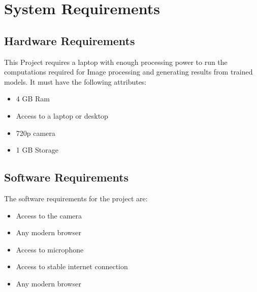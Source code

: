 \section{System Requirements}
\subsection{Hardware Requirements}
This Project requires a laptop with enough processing power to run the computations required for Image processing and generating results from trained models. It must have the following attributes:
\begin{itemize}
    \item 4 GB Ram
    \item Access to a laptop or desktop
    \item 720p camera
    \item 1 GB Storage
\end{itemize}
\subsection{Software Requirements}
The software requirements for the project are:
\begin{itemize}
    \item Access to the camera
    \item Any modern browser
    \item Access to microphone
    \item Access to stable internet connection
    \item Any modern browser
\end{itemize}